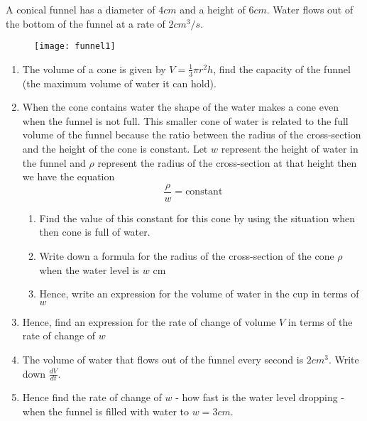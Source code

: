 A conical funnel has a diameter of $4cm$ and a height of $6cm$. Water flows out of the bottom of the funnel at a rate of $2cm^3/s$.
\begin{figure}[H]
	\centering
	\texttt{[image: funnel1]}
\end{figure}
\begin{enumerate}
	\item The volume of a cone is given by $V = \frac{1}{3} \pi r^2 h$, find the capacity of the funnel (the maximum volume of water it can hold).
	\item When the cone contains water the shape of the water makes a cone even when the funnel is not full. This smaller cone of water is related to the full volume of the funnel because the ratio between the radius of the cross-section and the height of the cone is constant. Let $w$ represent the height of water in the funnel and $\rho$ represent the radius of the cross-section at that height then we have the equation $$\frac{\rho}{w} = \text{constant}$$
	\begin{enumerate}
	    \item Find the value of this constant for this cone by using the situation when then cone is full of water.
	    \item Write down a formula for the radius of the cross-section of the cone $\rho$ when the water level is $w$ cm
	    \item Hence, write an expression for the volume of water in the cup in terms of $w$
	\end{enumerate}
	\item Hence, find an expression for the rate of change of volume $V$ in terms of the rate of change of $w$
	\item The volume of water that flows out of the funnel every second is $2cm^3$. Write down $\frac{dV}{dt}$.
	\item Hence find the rate of change of $w$ - how fast is the water level dropping - when the funnel is filled with water to $w=3cm$.
\end{enumerate}

